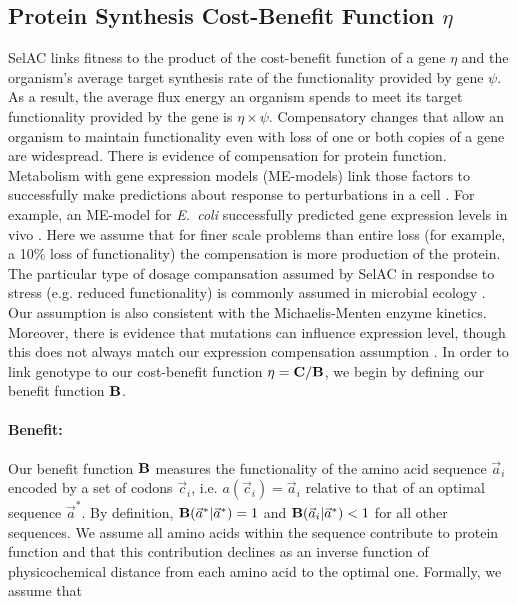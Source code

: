 \documentclass[onecolumn,letterpaper,fleqn,nogrid]{myMBE}%
\newcommand{\Cost}{\ensuremath{\text{\textbf{C}}}\xspace}
\newcommand{\Funcaoptvec}{\ensuremath{\Func(\aoptvec|\aoptvec)}\xspace}
\newcommand{\Funcaveci}{\ensuremath{\Func(\aveci|\aoptvec)}\xspace}
\newcommand{\Func}{\ensuremath{\text{\textbf{B}}}\xspace}
\newcommand{\selac}{SelAC\xspace}
\newcommand{\aoptvec}{\ensuremath{\Vec{a}^*}\xspace}
\newcommand{\aveci}{\ensuremath{\Vec{a}_i}\xspace}
\newcommand{\cveci}{\ensuremath{\cvec_i}\xspace}
\newcommand{\cvec}{\ensuremath{\Vec{c}}\xspace}
\begin{document}
\subsection{Protein Synthesis Cost-Benefit Function $\eta$}
\selac links fitness to the product of the cost-benefit function of a gene $\eta$ and the organism's average target synthesis rate of the functionality provided by gene $\psi$.
As a result, the average flux energy an organism spends to meet its target functionality provided by the gene is   $\eta \times \psi$.
Compensatory changes that allow an organism to maintain functionality even with loss of one or both copies of a gene are widespread.
There is evidence of compensation for protein function. Metabolism with gene expression models (ME-models) link those factors to successfully make predictions about response to perturbations in a cell \citep{KingEtAl2015,LermanEtAl2012}. For example, an ME-model for \emph{E.~coli} successfully predicted gene expression levels in vivo \citep{ThieleEtAl2012}.
Here we assume that for finer scale problems than entire loss (for example, a 10\% loss of functionality) the compensation is more production of the protein.
The particular type of dosage compansation assumed by \selac in respondse to stress (e.g. reduced functionality) is commonly assumed in microbial ecology \citep{allison2012, allison2017}.
Our assumption is also consistent with the Michaelis-Menten enzyme kinetics.
Moreover, there is evidence that mutations can influence expression level, though this does not always match our expression compensation assumption \citep{brown1997, zanger2013}.
In order to link genotype to our cost-benefit function $\eta = \Cost/\Func$, we begin by defining our benefit function \Func.


\paragraph{Benefit:}
Our benefit function \Func measures the functionality of the amino acid sequence \aveci encoded by a set of codons \cveci, i.e. $a(\cveci) = \aveci$ relative to that of an optimal sequence $\aoptvec$.
By definition, $\Funcaoptvec = 1$ and $\Funcaveci < 1$ for all other sequences.
We assume all amino acids within the sequence contribute to protein function and that this contribution declines as an inverse function of physicochemical distance from each amino acid to the optimal one.
Formally, we assume that
\end{document}
